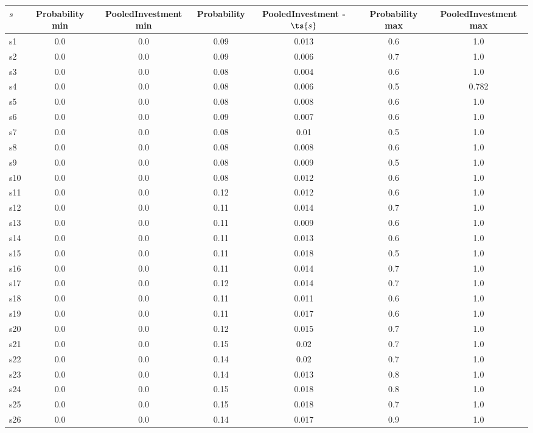 \documentclass{article}
\begin{document}
\noindent\begin{tabular}{|l|c|c|c|c|c|c|}
\hline
$s$& Probability min & PooledInvestment min & Probability & PooledInvestment - $\ts{s}$ & Probability max & PooledInvestment max\\
\hline
s1 &0.0 & 0.0 & 0.09 & 0.013 & 0.6 & 1.0\\
\hline
s2 &0.0 & 0.0 & 0.09 & 0.006 & 0.7 & 1.0\\
\hline
s3 &0.0 & 0.0 & 0.08 & 0.004 & 0.6 & 1.0\\
\hline
s4 &0.0 & 0.0 & 0.08 & 0.006 & 0.5 & 0.782\\
\hline
s5 &0.0 & 0.0 & 0.08 & 0.008 & 0.6 & 1.0\\
\hline
s6 &0.0 & 0.0 & 0.09 & 0.007 & 0.6 & 1.0\\
\hline
s7 &0.0 & 0.0 & 0.08 & 0.01 & 0.5 & 1.0\\
\hline
s8 &0.0 & 0.0 & 0.08 & 0.008 & 0.6 & 1.0\\
\hline
s9 &0.0 & 0.0 & 0.08 & 0.009 & 0.5 & 1.0\\
\hline
s10 &0.0 & 0.0 & 0.08 & 0.012 & 0.6 & 1.0\\
\hline
s11 &0.0 & 0.0 & 0.12 & 0.012 & 0.6 & 1.0\\
\hline
s12 &0.0 & 0.0 & 0.11 & 0.014 & 0.7 & 1.0\\
\hline
s13 &0.0 & 0.0 & 0.11 & 0.009 & 0.6 & 1.0\\
\hline
s14 &0.0 & 0.0 & 0.11 & 0.013 & 0.6 & 1.0\\
\hline
s15 &0.0 & 0.0 & 0.11 & 0.018 & 0.5 & 1.0\\
\hline
s16 &0.0 & 0.0 & 0.11 & 0.014 & 0.7 & 1.0\\
\hline
s17 &0.0 & 0.0 & 0.12 & 0.014 & 0.7 & 1.0\\
\hline
s18 &0.0 & 0.0 & 0.11 & 0.011 & 0.6 & 1.0\\
\hline
s19 &0.0 & 0.0 & 0.11 & 0.017 & 0.6 & 1.0\\
\hline
s20 &0.0 & 0.0 & 0.12 & 0.015 & 0.7 & 1.0\\
\hline
s21 &0.0 & 0.0 & 0.15 & 0.02 & 0.7 & 1.0\\
\hline
s22 &0.0 & 0.0 & 0.14 & 0.02 & 0.7 & 1.0\\
\hline
s23 &0.0 & 0.0 & 0.14 & 0.013 & 0.8 & 1.0\\
\hline
s24 &0.0 & 0.0 & 0.15 & 0.018 & 0.8 & 1.0\\
\hline
s25 &0.0 & 0.0 & 0.15 & 0.018 & 0.7 & 1.0\\
\hline
s26 &0.0 & 0.0 & 0.14 & 0.017 & 0.9 & 1.0\\

\end{tabular}
\end{document}
